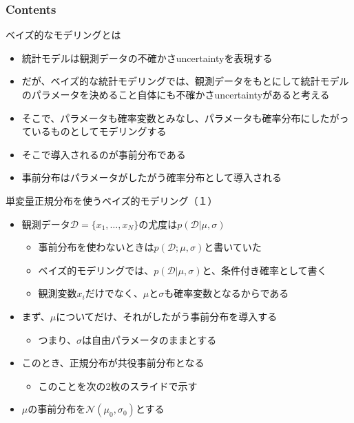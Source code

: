 \documentclass[aspectratio=169,unicode,dvipdfmx,14pt]{beamer}
\begin{document}
\begin{frame}\frametitle{Contents}
\Large \tableofcontents[currentsection]
\end{frame}

\begin{frame}{ベイズ的なモデリングとは}
\begin{itemize}
\item 統計モデルは観測データの不確かさuncertaintyを表現する
\item だが、ベイズ的な統計モデリングでは、観測データをもとにして統計モデルのパラメータを決めること自体にも不確かさuncertaintyがあると考える
\item そこで、パラメータも確率変数とみなし、パラメータも確率分布にしたがっているものとしてモデリングする
\item そこで導入されるのが事前分布である
\item 事前分布はパラメータがしたがう確率分布として導入される
\end{itemize}
\end{frame}

\begin{frame}{単変量正規分布を使うベイズ的モデリング（１）}
\begin{itemize}
\item 観測データ$\mathcal{D}=\{x_1,\ldots,x_N\}$の尤度は$p(\mathcal{D}|\mu,\sigma)$
\begin{itemize}
\item 事前分布を使わないときは$p(\mathcal{D};\mu,\sigma)$と書いていた
\item ベイズ的モデリングでは、$p(\mathcal{D}|\mu,\sigma)$と、条件付き確率として書く
\item 観測変数$x_i$だけでなく、$\mu$と$\sigma$も確率変数となるからである
\end{itemize}
\item まず、$\mu$についてだけ、それがしたがう事前分布を導入する
\begin{itemize}
\item つまり、$\sigma$は自由パラメータのままとする
\end{itemize}
\item このとき、正規分布が共役事前分布となる
\begin{itemize}
\item このことを次の2枚のスライドで示す
\end{itemize}
\item $\mu$の事前分布を$\mathcal{N}(\mu_0,\sigma_0)$とする
\end{itemize}
\end{frame}
\end{document}
